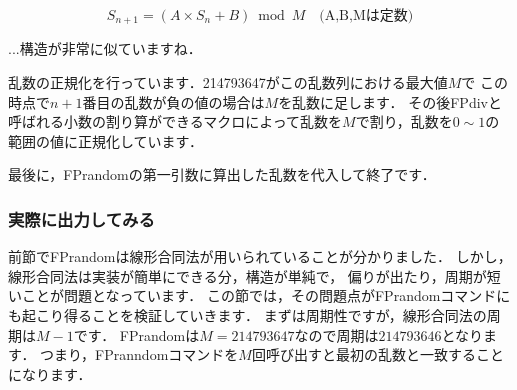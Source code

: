 \[
S_{n+1}=(A\times S_n + B) \bmod M \quad \textrm{(A,B,Mは定数)}
\]

...構造が非常に似ていますね．

乱数の正規化を行っています．214793647がこの乱数列における最大値$M$で
この時点で$n+1$番目の乱数が負の値の場合は$M$を乱数に足します．
その後FPdivと呼ばれる小数の割り算ができるマクロによって乱数を$M$で割り，乱数を$0\sim 1$の範囲の値に正規化しています．
最後に，FPrandomの第一引数に算出した乱数を代入して終了です．
\subsubsection{実際に出力してみる}
前節でFPrandomは線形合同法が用いられていることが分かりました．
しかし，線形合同法は実装が簡単にできる分，構造が単純で，
偏りが出たり，周期が短いことが問題となっています．
この節では，その問題点がFPrandomコマンドにも起こり得ることを検証していきます．
まずは周期性ですが，線形合同法の周期は$M-1$です．
FPrandomは$M=214793647$なので周期は$214793646$となります．
つまり，FPranndomコマンドを$M$回呼び出すと最初の乱数と一致することになります．
